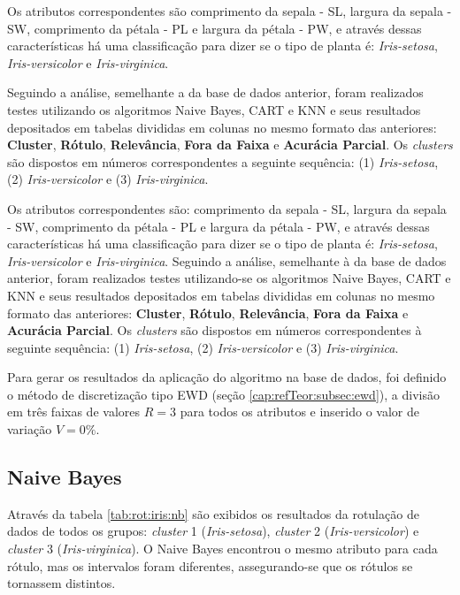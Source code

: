Os atributos correspondentes são comprimento da sepala - SL, largura da sepala - SW, comprimento da pétala - PL e largura da pétala - PW, e através dessas características há uma classificação para dizer se o tipo de planta é: \textit{Iris-setosa}, \textit{Iris-versicolor} e \textit{Iris-virginica}.

Seguindo a análise, semelhante a da base de dados anterior, foram realizados testes utilizando os algoritmos Naive Bayes, CART e KNN e seus resultados depositados em tabelas divididas em colunas no mesmo formato das anteriores: \textbf{Cluster}, \textbf{Rótulo}, \textbf{Relevância}, \textbf{Fora da Faixa} e \textbf{Acurácia Parcial}. Os \textit{clusters} são dispostos em números correspondentes a seguinte sequência: (1) \textit{Iris-setosa}, (2) \textit{Iris-versicolor} e (3) \textit{Iris-virginica}.
 
Os atributos correspondentes são: comprimento da sepala - SL, largura da sepala - SW, comprimento da pétala - PL e largura da pétala - PW, e através dessas características há uma classificação para dizer se o tipo de planta é: \textit{Iris-setosa}, \textit{Iris-versicolor} e \textit{Iris-virginica}. Seguindo a análise, semelhante à da base de dados anterior, foram realizados testes utilizando-se os algoritmos Naive Bayes, CART e KNN e seus resultados depositados em tabelas divididas em colunas no mesmo formato das anteriores: \textbf{Cluster}, \textbf{Rótulo}, \textbf{Relevância}, \textbf{Fora da Faixa} e \textbf{Acurácia Parcial}. Os \textit{clusters} são dispostos em números correspondentes à seguinte sequência: (1) \textit{Iris-setosa}, (2) \textit{Iris-versicolor} e (3) \textit{Iris-virginica}.
 
 
Para gerar os resultados da aplicação do algoritmo na base de dados, foi definido o método de discretização tipo EWD (seção \ref{cap:refTeor:subsec:ewd}), a divisão em três faixas de valores ${R = 3}$ para todos os atributos e inserido o valor de variação ${V=0\%}$. 

\subsection{Naive Bayes} \label{cap:resultados:ssec:iris:nb}

Através da tabela \ref{tab:rot:iris:nb}  são exibidos os resultados da rotulação de dados de todos os grupos: \textit{cluster} 1 (\textit{Iris-setosa}), \textit{cluster} 2 (\textit{Iris-versicolor}) e \textit{cluster} 3 (\textit{Iris-virginica}). O Naive Bayes encontrou o mesmo atributo para cada rótulo, mas os intervalos foram diferentes, assegurando-se que os rótulos se tornassem distintos. 
 
